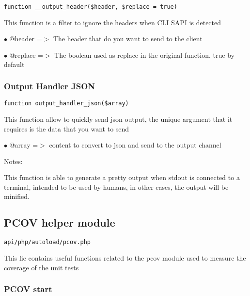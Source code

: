 \documentclass[a4paper]{article}
\begin{document}
\begin{lstlisting}
function __output_header($header, $replace = true)
\end{lstlisting}

This function is a filter to ignore the headers when CLI SAPI is detected

\begin{compactitem}
\item[\color{myblue}$\bullet$] @header  =$>$ The header that do you want to send to the client
\item[\color{myblue}$\bullet$] @replace =$>$ The boolean used as replace in the original function, true by default
\end{compactitem}

\hypertarget{toc186}{}
\subsubsection{Output Handler JSON}

\begin{lstlisting}
function output_handler_json($array)
\end{lstlisting}

This function allow to quickly send json output, the unique argument that it
requires is the data that you want to send

\begin{compactitem}
\item[\color{myblue}$\bullet$] @array =$>$ content to convert to json and send to the output channel
\end{compactitem}

Notes:

This function is able to generate a pretty output when stdout is connected to
a terminal, intended to be used by humans, in other cases, the output will be
minified.

\hypertarget{toc187}{}
\subsection{PCOV helper module}

\begin{lstlisting}
api/php/autoload/pcov.php
\end{lstlisting}

This fie contains useful functions related to the pcov module used to
measure the coverage of the unit tests

\hypertarget{toc188}{}
\subsubsection{PCOV start}
\end{document}
